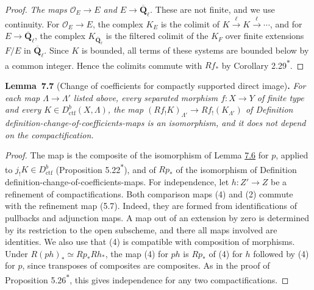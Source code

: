 \documentclass[11pt]{article}
\newenvironment{bpstatement}[2]{\par\addvspace{0.6\baselineskip}\noindent\textbf{#1}#2\textbf{.}\enspace\ignorespaces}
  {\par\addvspace{0.4\baselineskip}}
\newenvironment{bpstatementit}[2]{\begin{bpstatement}{#1}{#2}\itshape\ignorespaces}{\end{bpstatement}}
\newcommand{\bpout}[1]{#1\textsuperscript{\hyperlink{bp-outside}{\ensuremath{\ast}}}}
\begin{document}
\begin{proof}[{Proof}]
\emph{The maps \(\mathcal O_E\to E\) and \(E\to\overline{\mathbf Q}_\ell\).} These are not finite, and we use continuity. For \(\mathcal O_E\to E\), the complex \(K_E\) is the colimit of \(K\xrightarrow{\ell}K\xrightarrow{\ell}\cdots\), and for \(E\to\overline{\mathbf Q}_\ell\), the complex \(K_{\overline{\mathbf Q}_\ell}\) is the filtered colimit of the \(K_F\) over finite extensions \(F/E\) in \(\overline{\mathbf Q}_\ell\). Since \(K\) is bounded, all terms of these systems are bounded below by a common integer. Hence the colimits commute with \(Rf_*\) by Corollary \bpout{2.29}.
\end{proof}

\label{bp18}%
\begin{bpstatementit}{Lemma~7.7}{ (Change of coefficients for compactly supported direct image)}
For each map \(\Lambda\to\Lambda'\) listed above, every separated morphism \(f:X\to Y\) of finite type and every \(K\in D^b_{\mathrm{ctf}}(X,\Lambda)\), the map \((Rf_!K)_{\Lambda'}\to Rf_!(K_{\Lambda'})\) of Definition definition-change-of-coefficients-maps is an isomorphism, and it does not depend on the compactification.
\end{bpstatementit}

\begin{proof}[{Proof}]\label{bp19}%
The map is the composite of the isomorphism of Lemma \hyperref[bp16]{7.6} for \(p\), applied to \(j_!K\in D^b_{\mathrm{ctf}}\) (Proposition \bpout{5.22}), and of \(Rp_*\) of the isomorphism of Definition definition-change-of-coefficients-maps. For independence, let \(h:Z'\to Z\) be a refinement of compactifications. Both comparison maps (4) and (2) commute with the refinement map (5.7). Indeed, they are formed from identifications of pullbacks and adjunction maps. A map out of an extension by zero is determined by its restriction to the open subscheme, and there all maps involved are identities. We also use that (4) is compatible with composition of morphisms. Under \(R(ph)_*\simeq Rp_*Rh_*\), the map (4) for \(ph\) is \(Rp_*\) of (4) for \(h\) followed by (4) for \(p\), since transposes of composites are composites. As in the proof of Proposition \bpout{5.26}, this gives independence for any two compactifications.
\end{proof}
\end{document}
